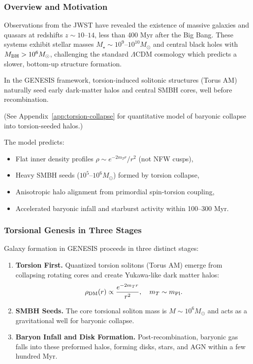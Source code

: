 \documentclass{article}
\begin{document}
\subsubsection{Overview and Motivation}
Observations from the JWST have revealed the existence of massive galaxies and quasars at redshifts $z \sim 10$--$14$, less than 400 Myr after the Big Bang. These systems exhibit stellar masses $M_\star \sim 10^{9}$--$10^{10} M_\odot$ and central black holes with $M_{\rm BH} > 10^6 M_\odot$, challenging the standard $\Lambda$CDM cosmology which predicts a slower, bottom-up structure formation.

In the GENESIS framework, torsion-induced solitonic structures (Torus AM) naturally seed early dark-matter halos and central SMBH cores, well before recombination. 

(See Appendix~\ref{app:torsion-collapse} for quantitative model of baryonic collapse into torsion-seeded halos.)


The model predicts:
\begin{itemize}
  \item Flat inner density profiles $\rho \sim e^{-2m_T r}/r^2$ (not NFW cusps),
  \item Heavy SMBH seeds ($10^5$--$10^6 M_\odot$) formed by torsion collapse,
  \item Anisotropic halo alignment from primordial spin-torsion coupling,
  \item Accelerated baryonic infall and starburst activity within 100--300 Myr.
\end{itemize}

\subsubsection{Torsional Genesis in Three Stages}
Galaxy formation in GENESIS proceeds in three distinct stages:
\begin{enumerate}
  \item \textbf{Torsion First.} Quantized torsion solitons (Torus AM) emerge from collapsing rotating cores and create Yukawa-like dark matter halos:
  \[
  \rho_{\rm DM}(r) \propto \frac{e^{-2m_T r}}{r^2}, \quad m_T \sim m_{\rm Pl}.
  \]

  \item \textbf{SMBH Seeds.} The core torsional soliton mass is $M \sim 10^6 M_\odot$ and acts as a gravitational well for baryonic collapse.

  \item \textbf{Baryon Infall and Disk Formation.} Post-recombination, baryonic gas falls into these preformed halos, forming disks, stars, and AGN within a few hundred Myr.
\end{enumerate}
\end{document}
